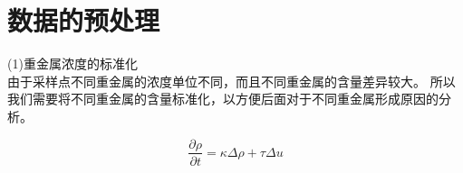 \documentclass[a4paper]{article}
\begin{document}
\section{数据的预处理}
(1)重金属浓度的标准化        \\
\indent 由于采样点不同重金属的浓度单位不同，而且不同重金属的含量差异较大。
所以我们需要将不同重金属的含量标准化，以方便后面对于不同重金属形成原因的分析。



\begin{equation}
\frac{\partial \rho}{\partial t} = \kappa \Delta \rho + \tau \Delta u
\end{equation}
\end{document}

